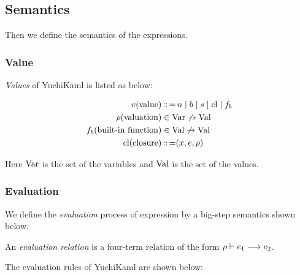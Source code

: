 
\subsection{Semantics}

Then we define the semantics of the expressions.

\subsubsection{Value}
\emph{Values} of YuchiKaml is listed as below:

\begin{align*}
    v (\text{value}) &\operatorname{:\!:=} n \mid b \mid  s \mid  \text{cl} \mid  f_b\\
    \rho  (\text{valuation}) &\in \text{Var} \not\to\text{Val} \\
    f_b{} (\text{built-in function})&\in \text{Val}\not\to\text{Val}\\
    \text{cl} (\text{closure}) &\operatorname{:\!:=} (x,e,\rho{})
\end{align*}

Here $\text{Var}$ is the set of the variables and $\text{Val}$ is the set of the values.

\subsubsection{Evaluation}
We define the \emph{evaluation} process of expression by a big-step semantics shown below.

An \emph{evaluation relation} is a four-term relation of the form $\rho \vdash e_1 \longrightarrow e_2$.

The evaluation rules of YuchiKaml are shown below:

{}

{}

{}

{}


\infrule[E-AppCls2]
{}
{}




